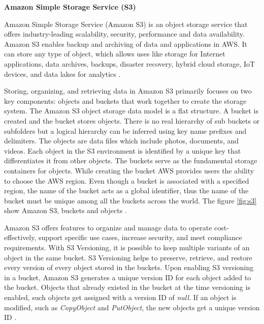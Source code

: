 {\textbf{Amazon Simple Storage Service (S3)}

\par Amazon Simple Storage Service (Amazon S3) is an object storage service that offers industry-leading scalability, security, performance and data availability. Amazon S3 enables backup and archiving of data and applications in AWS. It can store any type of object, which allows uses like storage for Internet applications, data archives, backups, disaster recovery, hybrid cloud storage, IoT devices, and data lakes for analytics \cite{36}.

\par Storing, organizing, and retrieving data in Amazon S3 primarily focuses on two key components: objects and buckets that work together to create the storage system. The Amazon S3 object storage data model is a flat structure. A bucket is created and the bucket stores objects. There is no real hierarchy of sub buckets or subfolders but a logical hierarchy can be inferred using key name prefixes and delimiters. The objects are data files which include photos, documents, and videos. Each object in the S3 environment is identified by a unique key that differentiates it from other objects. The buckets serve as the fundamental storage containers for objects. While creating the bucket AWS provides users the ability to choose the AWS region. Even though a bucket is associated with a specified region, the name of the bucket acts as a global identifier, thus the name of the bucket must be unique among all the buckets across the world. The figure \ref{fig:s3} show Amazon S3, buckets and objects \cite{37}.

\par Amazon S3 offers features to organize and manage data to operate cost-effectively, support specific use cases,
increase security, and meet compliance requirements. With S3 Versioning, it is possible to keep multiple variants of an object in the same bucket. S3 Versioning helps to preserve, retrieve, and restore every version of every object stored in the buckets. Upon enabling S3 versioning in a bucket, Amazon S3 generates a unique version ID for each object added to the bucket. Objects that already existed in the bucket at the time versioning is enabled, such objects get assigned with a version ID of \textit{null}. If an object is modified, such as \textit{CopyObject} and \textit{PutObject}, the new objects get a unique version ID \cite{72}.

}
